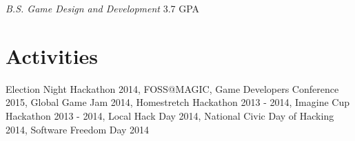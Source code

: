 \documentclass[line,margin]{res}
\begin{document}
\begin{resume}
{\sl B.S. Game Design and Development} \hfill 3.7 GPA 


\section{Activities}
Election Night Hackathon 2014, FOSS@MAGIC, Game Developers Conference 2015,
Global Game Jam 2014, Homestretch Hackathon 2013 - 2014, Imagine Cup Hackathon 2013 - 2014,
Local Hack Day 2014, National Civic Day of Hacking 2014, Software Freedom Day 2014



\end{resume}
\end{document}

